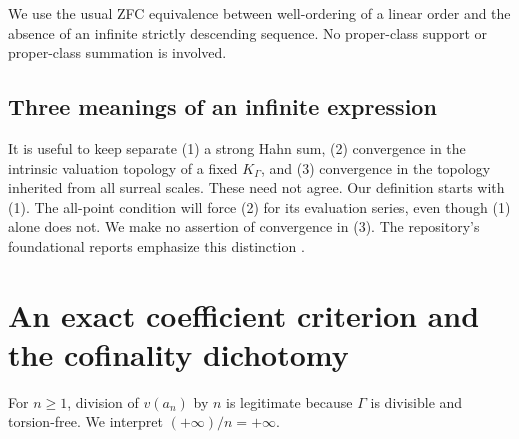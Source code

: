 \documentclass[11pt]{article}
\theoremstyle{plain}
\theoremstyle{plain}
\theoremstyle{plain}
\theoremstyle{definition}
\theoremstyle{definition}
\theoremstyle{definition}
\theoremstyle{remark}
\newcommand{\K}{K_\Gamma}\newcommand{\E}{\mathcal E_\Gamma}
\begin{document}
We use the usual ZFC equivalence between well-ordering of a linear
order and the absence of an infinite strictly descending sequence.
No proper-class support or proper-class summation is involved.

\subsection{Three meanings of an infinite expression}
It is useful to keep separate (1) a strong Hahn sum, (2) convergence in
the intrinsic valuation topology of a fixed $\K$, and (3) convergence
in the topology inherited from all surreal scales. These need not agree.
Our definition starts with (1). The all-point condition will force
(2) for its evaluation series, even though (1) alone does not. We make
no assertion of convergence in (3). The repository's foundational
reports emphasize this distinction \cite{RepoCatalogue,RepoRankOne}.

\section{An exact coefficient criterion and the cofinality dichotomy}
\label{sec:growth}

For $n\ge1$, division of $v(a_n)$ by $n$ is legitimate because $\Gamma$
is divisible and torsion-free. We interpret $(+\infty)/n=+\infty$.
\end{document}

